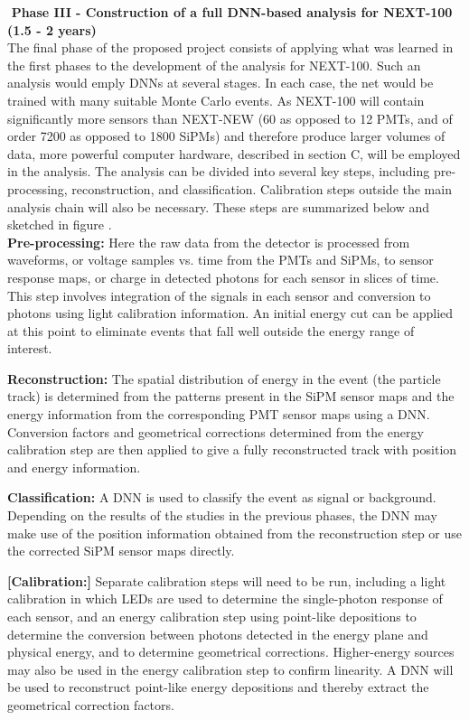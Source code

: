 \documentclass[11pt,a4paper]{article}
\begin{document}
\noindent\textbf{\textbullet\,\,Phase III - Construction of a full DNN-based analysis for NEXT-100 (1.5 - 2 years)}\\
The final phase of the proposed project consists of applying what was learned in the first phases to the development of the analysis for NEXT-100. Such an analysis would emply DNNs at several stages. In each case, the net would be trained with many suitable Monte Carlo events. As NEXT-100 will contain significantly more sensors than NEXT-NEW (60 as opposed to 12 PMTs, and of order 7200 as opposed to 1800 SiPMs) and therefore produce larger volumes of data, more powerful computer hardware, described in section C, will be employed in the analysis. The analysis can be divided into several key steps, including pre-processing, reconstruction, and classification. Calibration steps outside the main analysis chain will also be necessary. These steps are summarized below and sketched in figure .\\

\textbf{Pre-processing:} Here the raw data from the detector is processed from waveforms, or voltage samples vs. time from the PMTs and SiPMs, to sensor response maps, or charge in detected photons for each sensor in slices of time. This step involves integration of the signals in each sensor and conversion to photons using light calibration information. An initial energy cut can be applied at this point to eliminate events that fall well outside the energy range of interest.

\textbf{Reconstruction:} The spatial distribution of energy in the event (the particle track) is determined from the patterns present in the SiPM sensor maps and the energy information from the corresponding PMT sensor maps using a DNN. Conversion factors and geometrical corrections determined from the energy calibration step are then applied to give a fully reconstructed track with position and energy information.

\textbf{Classification:} A DNN is used to classify the event as signal or background. Depending on the results of the studies in the previous phases, the DNN may make use of the position information obtained from the reconstruction step or use the corrected SiPM sensor maps directly.

\textbf{[Calibration:]} Separate calibration steps will need to be run, including a light calibration in which LEDs are used to determine the single-photon response of each sensor, and an energy calibration step using point-like depositions to determine the conversion between photons detected in the energy plane and physical energy, and to determine geometrical corrections. Higher-energy sources may also be used in the energy calibration step to confirm linearity. A DNN will be used to reconstruct point-like energy depositions and thereby extract the geometrical correction factors.
\end{document}
